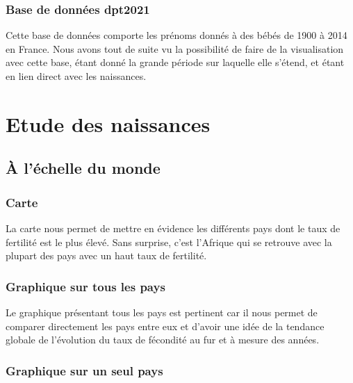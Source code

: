 \documentclass[
]{article}
\begin{document}
\hypertarget{base-de-donnuxe9es-dpt2021}{%
\subsubsection{Base de données
dpt2021}\label{base-de-donnuxe9es-dpt2021}}

Cette base de données comporte les prénoms donnés à des bébés de 1900 à
2014 en France. Nous avons tout de suite vu la possibilité de faire de
la visualisation avec cette base, étant donné la grande période sur
laquelle elle s'étend, et étant en lien direct avec les naissances.

\hypertarget{etude-des-naissances}{%
\section{Etude des naissances}\label{etude-des-naissances}}

\hypertarget{uxe0-luxe9chelle-du-monde}{%
\subsection{À l'échelle du monde}\label{uxe0-luxe9chelle-du-monde}}

\hypertarget{carte}{%
\subsubsection{Carte}\label{carte}}

La carte nous permet de mettre en évidence les différents pays dont le
taux de fertilité est le plus élevé. Sans surprise, c'est l'Afrique qui
se retrouve avec la plupart des pays avec un haut taux de fertilité.

\hypertarget{graphique-sur-tous-les-pays}{%
\subsubsection{Graphique sur tous les
pays}\label{graphique-sur-tous-les-pays}}

Le graphique présentant tous les pays est pertinent car il nous permet
de comparer directement les pays entre eux et d'avoir une idée de la
tendance globale de l'évolution du taux de fécondité au fur et à mesure
des années.

\hypertarget{graphique-sur-un-seul-pays}{%
\subsubsection{Graphique sur un seul
pays}\label{graphique-sur-un-seul-pays}}
\end{document}
